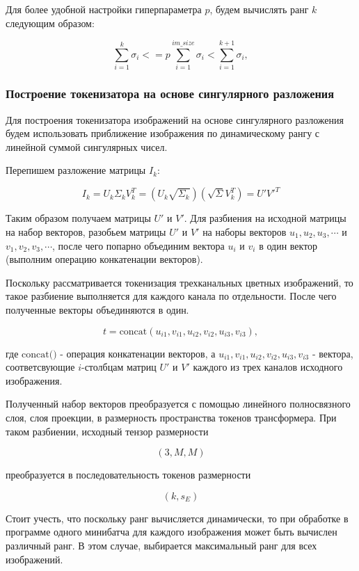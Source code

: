 Для более удобной настройки гиперпараметра $p$, будем вычислять ранг $k$ следующим образом:

$$
    \sum_{i=1}^{k} \sigma_i <= p\sum_{i=1}^{im\_size} \sigma_i < \sum_{i=1}^{k+1} \sigma_i,
$$

\subsubsection{Построение токенизатора на основе сингулярного разложения}

Для построения токенизатора изображений на основе сингулярного разложения будем использовать приближение изображения по динамическому рангу с линейной суммой сингулярных чисел.

Перепишем разложение матрицы $I_k$:

$$
I_k = U_k\Sigma_kV_k^T = (U_k\sqrt{\Sigma_k})(\sqrt{\Sigma}V_k^T) = U'V'^T
$$

Таким образом получаем матрицы $U'$ и $V'$. Для разбиения на исходной матрицы на набор векторов, разобьем матрицы $U'$ и $V'$ на наборы векторов $u_1, u_2, u_3, \cdots$ и $v_1, v_2, v_3, \cdots$, после чего попарно объединим вектора $u_i$ и $v_i$ в один вектор (выполним операцию конкатенации векторов).

Поскольку рассматривается токенизация трехканальных цветных изображений, то такое разбиение выполняется для каждого канала по отдельности. После чего полученные векторы объединяются в один.

$$
t = \text{concat}(u_{i1}, v_{i1}, u_{i2}, v_{i2}, u_{i3}, v_{i3}),
$$

где $\text{concat()}$ - операция конкатенации векторов, а $u_{i1}, v_{i1}, u_{i2}, v_{i2}, u_{i3}, v_{i3}$ - вектора, соответсвующие $i$-столбцам матриц $U'$ и $V'$ каждого из трех каналов исходного изображения.

Полученный набор векторов преобразуется с помощью линейного полносвязного слоя, слоя проекции, в размерность пространства токенов трансформера. При таком разбиении, исходный тензор размерности

$$
(3, M, M)
$$

преобразуется в последовательность токенов размерности

$$
(k, s_E)
$$

Стоит учесть, что поскольку ранг вычисляется динамически, то при обработке в программе одного минибатча для каждого изображения может быть вычислен различный ранг. В этом случае, выбирается максимальный ранг для всех изображений.

